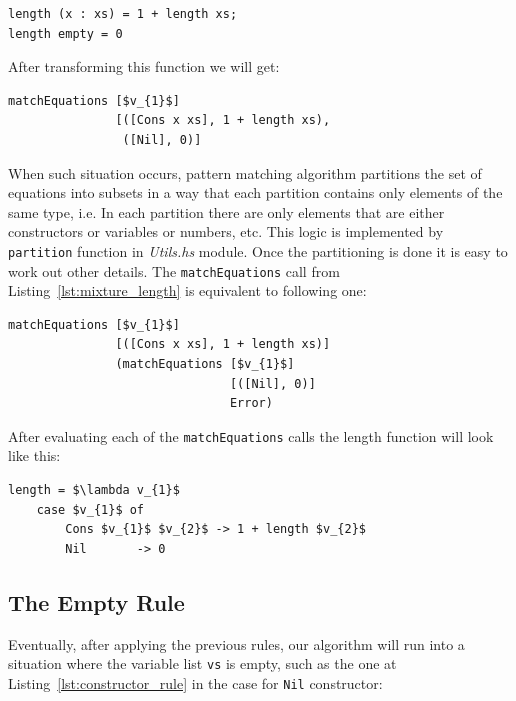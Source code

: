 \documentclass[12pt,a4paper]{report}
\begin{document}
\vspace*{0.2in}
\begin{lstlisting}
length (x : xs) = 1 + length xs;
length empty = 0
\end{lstlisting}
After transforming this function we will get:

\vspace*{0.2in}
\begin{lstlisting}[style=haskell,label=lst:mixture_length, mathescape=true,
  caption={Mixture rule application.}]
matchEquations [$v_{1}$]
               [([Cons x xs], 1 + length xs),
                ([Nil], 0)]
\end{lstlisting}
When such situation occurs, pattern matching algorithm partitions the set of
equations into subsets in a way that each partition contains only elements of
the same type, i.e. In each partition there are only elements that are either
constructors or variables or numbers, etc. This logic is implemented by
\texttt{partition} function in \textit{Utils.hs} module. Once the partitioning
is done it is easy to work out other details. The \texttt{matchEquations} call
from Listing~\ref{lst:mixture_length} is equivalent to following one:

\vspace*{0.2in}
\begin{lstlisting}[style=haskell,mathescape=true]
matchEquations [$v_{1}$]
               [([Cons x xs], 1 + length xs)]
               (matchEquations [$v_{1}$]
                               [([Nil], 0)]
                               Error)
\end{lstlisting}
After evaluating each of the \texttt{matchEquations} calls the length function
will look like this:

\vspace*{0.2in}
\begin{lstlisting}[style=haskell,mathescape=true]
length = $\lambda v_{1}$
    case $v_{1}$ of
        Cons $v_{1}$ $v_{2}$ -> 1 + length $v_{2}$
        Nil       -> 0
\end{lstlisting}


\subsection{The Empty Rule}
Eventually, after applying the previous rules, our algorithm will run into a
situation where the variable list \texttt{vs} is empty, such as the one at
Listing~\ref{lst:constructor_rule} in the case for \texttt{Nil} constructor:
\end{document}
